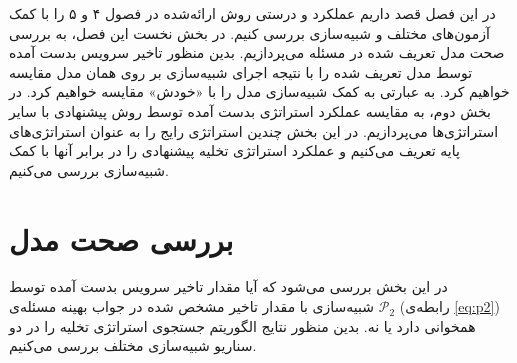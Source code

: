 در این فصل قصد داریم عملکرد و درستی روش ارائه‌شده در فصول ۴ و ۵ را با کمک آزمون‌های مختلف و شبیه‌سازی بررسی کنیم. در بخش نخست این فصل، به بررسی صحت مدل تعریف شده در مسئله می‌پردازیم. بدین منظور تاخیر سرویس بدست آمده توسط مدل تعریف شده را با نتیجه اجرای شبیه‌سازی بر روی همان مدل مقایسه خواهیم کرد. به عبارتی به کمک شبیه‌سازی مدل را با «خودش» مقایسه خواهیم کرد. در بخش دوم، به مقایسه عملکرد استراتژی بدست آمده توسط روش پیشنهادی با سایر استراتژی‌ها می‌پردازیم. در این بخش چندین استراتژی رایج را به عنوان استراتژی‌های پایه تعریف می‌کنیم و عملکرد استراتژی تخلیه پیشنهادی را در برابر آنها با کمک شبیه‌سازی بررسی می‌کنیم.
\section{بررسی صحت مدل}
در این بخش بررسی می‌شود که آیا مقدار تاخیر سرویس بدست آمده توسط شبیه‌سازی با مقدار تاخیر مشخص شده در جواب بهینه مسئله‌ی 
$\mathcal{P}_2$
 (رابطه‌ی \ref{eq:p2}) همخوانی دارد یا نه. بدین منظور نتایج الگوریتم جستجوی استراتژی تخلیه را در دو سناریو شبیه‌سازی مختلف بررسی می‌کنیم.
